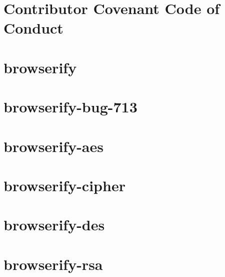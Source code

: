 \documentclass[twoside]{book}
\newcommand{\+}{\discretionary{\mbox{\scriptsize$\hookleftarrow$}}{}{}}
\begin{document}
\chapter{Contributor Covenant Code of Conduct}
\label{md_dsmacc_examples_DRmerge_node_modules_browserify_code-of-conduct}

\chapter{browserify}
\label{md_dsmacc_examples_DRmerge_node_modules_browserify_readme}

\chapter{browserify-\/bug-\/713}
\label{md_dsmacc_examples_DRmerge_node_modules_browserify_test_cycle_README}

\chapter{browserify-\/aes}
\label{md_dsmacc_examples_DRmerge_node_modules_browserify-aes_README}

\chapter{browserify-\/cipher}
\label{md_dsmacc_examples_DRmerge_node_modules_browserify-cipher_README}

\chapter{browserify-\/des}
\label{md_dsmacc_examples_DRmerge_node_modules_browserify-des_readme}

\chapter{browserify-\/rsa}
\label{md_dsmacc_examples_DRmerge_node_modules_browserify-rsa_readme}

\end{document}
